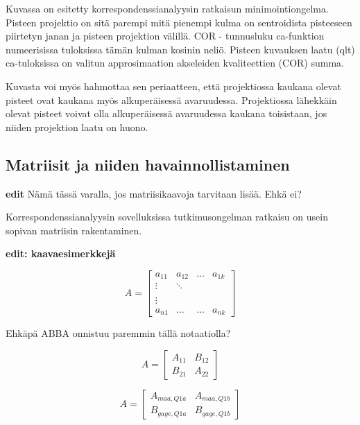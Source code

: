 \documentclass[
  finnish,
]{book}
\begin{document}
Kuvassa on esitetty korrespondenssianalyysin ratkaisun minimointiongelma. Pisteen
projektio on sitä parempi mitä pienempi kulma on sentroidista pisteeseen
piirtetyn janan ja pisteen projektion välillä. COR - tunnusluku ca-funktion
numeerisissa tuloksissa tämän kulman kosinin neliö. Pisteen kuvauksen laatu (qlt)
ca-tuloksissa on valitun approsimaation akseleiden kvaliteettien (COR) summa.

Kuvasta voi myös hahmottaa sen periaatteen, että projektiossa kaukana olevat
pisteet ovat kaukana myös alkuperäisessä avaruudessa. Projektiossa lähekkäin
olevat pisteet voivat olla alkuperäisessä avaruudessa kaukana toisistaan,
jos niiden projektion laatu on huono.

\hypertarget{matriisit-ja-niiden-havainnollistaminen}{%
\subsection*{Matriisit ja niiden havainnollistaminen}\label{matriisit-ja-niiden-havainnollistaminen}}

\textbf{edit} Nämä tässä varalla, jos matriisikaavoja tarvitaan lisää. Ehkä ei?

Korrespondenssianalyysin sovelluksissa tutkimusongelman ratkaisu on usein sopivan
matriisin rakentaminen.

\textbf{edit: kaavaesimerkkejä}

\begin{equation}
A = \begin{bmatrix}
    a_{11} & a_{12} & \dots & a_{1k}\\
    \vdots & \ddots & \\
    \\
    \vdots \\
    a_{n1} & \dots  & \dots & a_{nk}
    \end{bmatrix}
\end{equation}

Ehkäpä ABBA onnistuu paremmin tällä notaatiolla?

\begin{equation}
A = \begin{bmatrix}
    A_{11} & B_{12}  \\
    B_{21} & A_{22}
    \end{bmatrix}
\end{equation}

\begin{equation}
A = \begin{bmatrix}
    A_{maa, Q1a} & A_{maa, Q1b}  \\
    B_{gage, Q1a} & B_{gage, Q1b}
    \end{bmatrix}
\end{equation}
\end{document}
